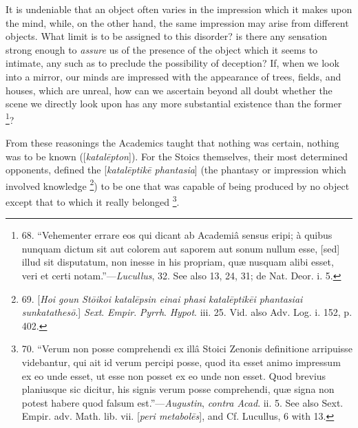 It is undeniable that an
object often varies in the impression which it makes upon the mind,
while, on the other hand, the same impression may arise from different
objects. What limit is to be assigned to this disorder? is there any
sensation strong enough to \emph{assure} us of the presence of the
object which it seems to intimate, any such as to preclude the
possibility of deception? If, when we look into a mirror, our minds
are impressed with the appearance of trees, fields, and houses, which
are unreal, how can we ascertain beyond all doubt whether the scene we
directly look upon has any more substantial existence than the former
\footnote{68. ``Vehementer errare eos qui
dicant ab Academiâ sensus eripi; à quibus nunquam dictum sit aut
colorem aut saporem aut sonum nullum esse, [sed] illud sit disputatum,
non inesse in his propriam, quæ nusquam alibi esset, veri et certi
notam.''—\emph{Lucullus}, 32. See also 13, 24, 31; de Nat. Deor. i.
5.}?

From these reasonings the
Academics taught that nothing was certain, nothing was to be known ([\emph{katal\={e}pton}]).
For the Stoics themselves, their most determined opponents, defined
the [\emph{katal\={e}ptik\={e} phantasia}] (the phantasy or
impression which involved knowledge \footnote{69. [\emph{Hoi goun St\={o}ikoi
katal\={e}psin einai phasi katal\={e}ptik\={e}i phantasiai
sunkatathes\={o}}.] \emph{Sext}. \emph{Empir}. \emph{Pyrrh}. \emph{Hypot}.
iii. 25. Vid. also Adv. Log. i. 152, p. 402.}) to be one that was capable of being produced by no
object except that to which it really belonged \footnote{70. ``Verum non posse
comprehendi ex illâ Stoici Zenonis definitione arripuisse videbantur,
qui ait id verum percipi posse, quod ita esset animo impressum ex eo
unde esset, ut esse non posset ex eo unde non esset. Quod brevius
planiusque sic dicitur, his signis verum posse comprehendi, quæ signa
non potest habere quod falsum est.''—\emph{Augustin}, \emph{contra Acad}.
ii. 5. See also Sext. Empir. adv. Math. lib. vii. [\emph{peri metabol\={e}s}],
and Cf. Lucullus, 6 with 13.}.

